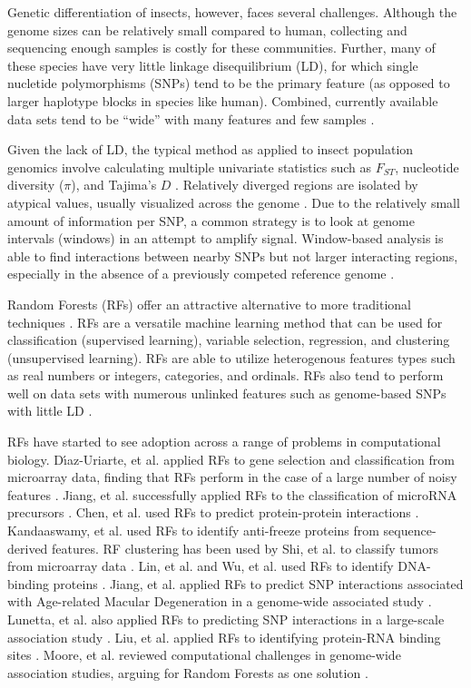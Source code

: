 Genetic differentiation of insects, however, faces several challenges. Although the genome sizes can be relatively small compared to human, collecting and sequencing enough samples is costly for these communities.  Further, many of these species have very little linkage disequilibrium (LD), for which single nucletide polymorphisms (SNPs) tend to be the primary feature (as opposed to larger haplotype blocks in species like human). Combined, currently available data sets tend to be ``wide'' with many features and few samples \cite{Lawniczak2010, Egan2015, Fontaine2015}.

Given the lack of LD, the typical method as applied to insect population genomics involve calculating multiple univariate statistics such as $F_{ST}$, nucleotide diversity ($\pi$), and Tajima's $D$ \cite{Fontaine2015}. Relatively diverged regions are isolated by atypical values, usually visualized across the genome \cite{Egan2015, Fontaine2015}. Due to the relatively small amount of information per SNP, a common strategy is to look at genome intervals (windows) in an attempt to amplify signal. Window-based analysis is able to find interactions between nearby SNPs but not larger interacting regions, especially in the absence of a previously competed reference genome \cite{Egan2015}.

Random Forests (RFs) offer an attractive alternative to more traditional techniques \cite{Breiman1999}. RFs are a versatile machine learning method that can be used for classification (supervised learning), variable selection, regression, and clustering (unsupervised learning).  RFs are able to utilize heterogenous features types such as real numbers or integers, categories, and ordinals. RFs also tend to perform well on data sets with numerous unlinked features such as genome-based SNPs with little LD \cite{Meng2009}.

RFs have started to see adoption across a range of problems in computational biology.  D\'{\i}az-Uriarte, et al. applied RFs to gene selection and classification from microarray data, finding that RFs perform in the case of a large number of noisy features \cite{Diaz-Uriarte2006}. Jiang, et al. successfully applied RFs to the classification of microRNA precursors \cite{Jiang2007}. Chen, et al. used RFs to predict protein-protein interactions \cite{Chen2005}. Kandaaswamy, et al. used RFs to identify anti-freeze proteins from sequence-derived features. RF clustering has been used by Shi, et al. to classify tumors from microarray data \cite{Shi2005}. Lin, et al. and Wu, et al. used RFs to identify DNA-binding proteins \cite{Lin2011}. Jiang, et al. applied RFs to predict SNP interactions associated with Age-related Macular Degeneration in a genome-wide associated study \cite{Jiang2009}. Lunetta, et al. also applied RFs to predicting SNP interactions in a large-scale association study \cite{Lunetta2004}.  Liu, et al. applied RFs to identifying protein-RNA binding sites \cite{Liu2010}. Moore, et al. reviewed computational challenges in genome-wide association studies, arguing for Random Forests as one solution \cite{Moore2010}.

